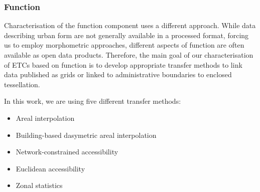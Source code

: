 \subsubsection*{Function}
Characterisation of the function component uses a different approach. While data
describing urban form are not generally available in a processed format, forcing us to employ morphometric approaches, different aspects of function are often available as
open data products. Therefore, the main goal of our characterisation of ETCs based on
function is to develop appropriate transfer methods to link data published as grids or
linked to administrative boundaries to enclosed tessellation.

In this work, we are using five different transfer methods:

\begin{itemize}
    \item Areal interpolation
    \item Building-based dasymetric areal interpolation
    \item Network-constrained accessibility
    \item Euclidean accessibility
    \item Zonal statistics
\end{itemize}

